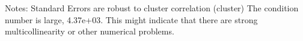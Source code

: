 Notes: \newline
 [1] Standard Errors are robust to cluster correlation (cluster) \newline
 [2] The condition number is large, 4.37e+03. This might indicate that there are \newline
 strong multicollinearity or other numerical problems.